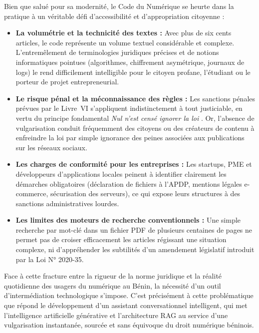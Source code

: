 Bien que salué pour sa modernité, le Code du Numérique se heurte dans la pratique à un véritable défi d'accessibilité et d'appropriation citoyenne :
\begin{itemize}
    \item \textbf{La volumétrie et la technicité des textes :} Avec plus de six cents articles, le code représente un volume textuel considérable et complexe. L'entremêlement de terminologies juridiques précises et de notions informatiques pointues (algorithmes, chiffrement asymétrique, journaux de logs) le rend difficilement intelligible pour le citoyen profane, l'étudiant ou le porteur de projet entrepreneurial.

    \item \textbf{Le risque pénal et la méconnaissance des règles :} Les sanctions pénales prévues par le Livre~VI s'appliquent indistinctement à tout justiciable, en vertu du principe fondamental \og \textit{Nul n'est censé ignorer la loi} \fg{}. Or, l'absence de vulgarisation conduit fréquemment des citoyens ou des créateurs de contenu à enfreindre la loi par simple ignorance des peines associées aux publications sur les réseaux sociaux.

    \item \textbf{Les charges de conformité pour les entreprises :} Les startups, PME et développeurs d'applications locales peinent à identifier clairement les démarches obligatoires (déclaration de fichiers à l'APDP, mentions légales e-commerce, sécurisation des serveurs), ce qui expose leurs structures à des sanctions administratives lourdes.

    \item \textbf{Les limites des moteurs de recherche conventionnels :} Une simple recherche par mot-clé dans un fichier PDF de plusieurs centaines de pages ne permet pas de croiser efficacement les articles régissant une situation complexe, ni d'appréhender les subtilités d'un amendement législatif introduit par la Loi N° 2020-35.
\end{itemize}

Face à cette fracture entre la rigueur de la norme juridique et la réalité quotidienne des usagers du numérique au Bénin, la nécessité d'un outil d'intermédiation technologique s'impose. C'est précisément à cette problématique que répond le développement d'un assistant conversationnel intelligent, qui met l'intelligence artificielle générative et l'architecture RAG au service d'une vulgarisation instantanée, sourcée et sans équivoque du droit numérique béninois.

